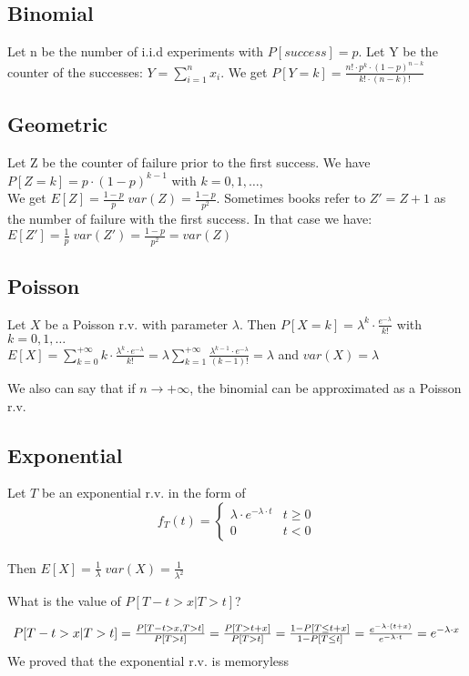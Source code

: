 \subsection{Binomial}
Let n be the number of i.i.d experiments with $P[success]=p$. Let Y be the counter of the successes:
$Y=\sum\limits_{i=1}^{n} x_i$. We get $P[Y=k]= \frac{n! \cdot p^k \cdot (1-p)^{n-k}}{k! \cdot (n-k)!}$

\subsection{Geometric}
Let Z be the counter of failure prior to the first success. We have $P[Z=k] = p \cdot (1-p)^{k-1}$ with $k=0,1,\dots$, \\
We get $E[Z]=\frac{1-p}{p} \; var(Z)=\frac{1-p}{p^2}$.
Sometimes books refer to $Z'=Z+1$ as the number of failure with the first success. In that case we have:\\
$E[Z']=\frac{1}{p} \; var(Z')=\frac{1-p}{p^2}=var(Z)$

\subsection{Poisson}
Let $X$ be a Poisson r.v. with parameter $\lambda$. Then $P[X=k] = \lambda^k \cdot \frac{e^{-\lambda}}{k!}$ with $k=0,1,\dots$
\\
$E[X]=\sum\limits_{k=0}^{+\infty}k \cdot \frac{\lambda^k \cdot e^{-\lambda}}{k!}= \lambda \sum\limits_{k=1}^{+\infty}\frac{\lambda^{k-1}\cdot e^{-\lambda}}{(k-1)!}=\lambda$
and $var(X)=\lambda$

We also can say that if $n \to +\infty$, the binomial can be approximated as a Poisson r.v.

\subsection{Exponential}
Let $T$ be an exponential r.v. in the form of
$$f_T(t)=
\begin{cases}
  \lambda \cdot e^{-\lambda \cdot t} & t \ge 0 \\
  0 & t <0
\end{cases}
$$
\\
Then $E[X]= \frac{1}{\lambda} \; var(X)=\frac{1}{\lambda^2}$

What is the value of $P[T-t > x | T>t]$?

\begin{equation}
  $$P[T-t > x | T>t]=\frac{P[T-t > x , T>t]}{P[T>t]}=\frac{P[T > t+x ]}{P[T>t]}=\frac{1-P[T \le t+x]}{1-P[T\le t]}=\frac{e^{-\lambda \cdot (t+x)}}{e^{-\lambda \cdot t}} = e^{-\lambda \cdot x}$$
\end{equation}
We proved that the exponential r.v. is memoryless


